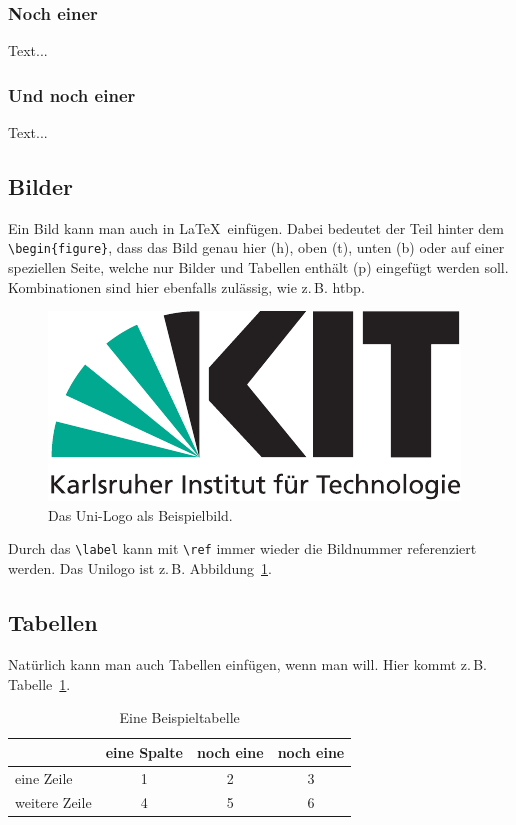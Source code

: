 \documentclass[12pt,a4paper,twoside]{article}
\theoremstyle{definition}
\numberwithin{equation}{section}
\begin{document}
\subsubsection{Noch einer}
Text...

\subsubsection{Und noch einer}
Text...

\subsection{Bilder}
Ein Bild kann man auch in \LaTeX\ einfügen. Dabei bedeutet der Teil hinter dem \verb|\begin{figure}|, dass das Bild genau hier (h), oben (t), unten (b) oder auf einer speziellen Seite, welche nur Bilder und Tabellen enthält (p) eingefügt werden soll. Kombinationen sind hier ebenfalls zulässig, wie z.\,B. \lbrack htbp\rbrack.

\begin{figure}[h]
\begin{center}
\includegraphics[width=0.8\columnwidth]{KITlogo_4c_deutsch_RGB.pdf}
\caption{Das Uni-Logo als Beispielbild.} 
\label{bild_Referenz}
\end{center}
\end{figure}
Durch das \verb|\label| kann mit \verb|\ref| immer wieder
die Bildnummer referenziert werden. Das Unilogo ist z.\,B. Abbildung~\ref{bild_Referenz}.

\subsection{Tabellen}
Natürlich kann man auch Tabellen einfügen, wenn man will. Hier kommt z.\,B. Tabelle~\ref{tabelle_Referenz}.
\vspace{\baselineskip}

\begin{table}[h]
\centering
\begin{tabular}{|l||c|c|c|} \hline
& eine Spalte & noch eine & noch eine \\ \hline \hline
eine Zeile & 1 & 2 & 3 \\ \hline
weitere Zeile & 4 & 5 & 6 \\ \hline
\end{tabular}
\caption{Eine Beispieltabelle}
\label{tabelle_Referenz}
\end{table}
\end{document}
